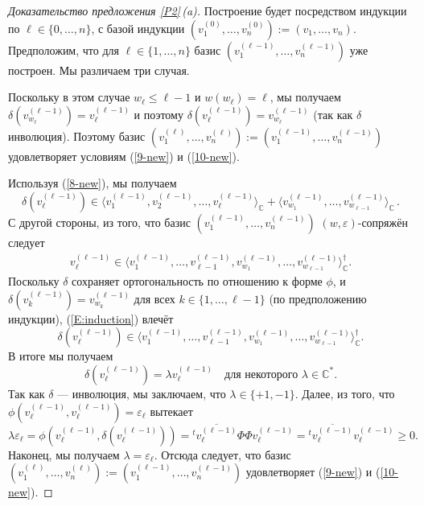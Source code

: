 \documentclass{amsart}
\theoremstyle{definition}
\begin{document}
\begin{proof}[Доказательство предложения \ref{P2}\,{\rm (a)}]
Построение будет посредством индукции по $\ell\in\{0,\ldots,n\}$, с базой индукции
$(v_1^{(0)},\ldots,v_n^{(0)}):=(v_1,\ldots,v_n)$. Предположим, что для
$\ell\in\{1,\ldots,n\}$  базис
$(v_1^{(\ell-1)},\ldots,v_n^{(\ell-1)})$ уже построен. Мы различаем три случая.

\medskip
{}

Поскольку в этом случае $w_\ell\leq\ell-1$ и $w(w_\ell)=\ell$, мы получаем
$\delta(v_{w_\ell}^{(\ell-1)})=v_{\ell}^{(\ell-1)}$ и поэтому
$\delta(v_{\ell}^{(\ell-1)})=v_{w_\ell}^{(\ell-1)}$ (так как
$\delta$ инволюция). Поэтому базис
$(v_1^{(\ell)},\ldots,v_n^{(\ell)}):=(v_1^{(\ell-1)},\ldots,v_n^{(\ell-1)})$
удовлетворяет условиям (\ref{9-new}) и (\ref{10-new}).

\medskip
{}

Используя (\ref{8-new}), мы получаем
\[\delta(v_\ell^{(\ell-1)})\in\langle v_1^{(\ell-1)},v_2^{(\ell-1)},\ldots,v_\ell^{(\ell-1)}\rangle_\mathbb{C}+\langle v_{w_1}^{(\ell-1)},\ldots,v_{w_{\ell-1}}^{(\ell-1)}\rangle_\mathbb{C}\,.\]
С другой стороны, из того, что базис
$(v_1^{(\ell-1)},\ldots,v_n^{(\ell-1)})$
$(w,\varepsilon)$-сопряжён следует
\begin{align}v_\ell^{(\ell-1)}\in\langle v_1^{(\ell-1)},\ldots,v_{\ell-1}^{(\ell-1)},v_{w_1}^{(\ell-1)},\ldots,v_{w_{\ell-1}}^{(\ell-1)}\rangle_\mathbb{C}^\dag.
\label{E:induction}
\end{align}
Поскольку $\delta$ сохраняет ортогональность по отношению к форме
$\phi$, и  $\delta(v_k^{(\ell-1)})=v_{w_k}^{(\ell-1)}$
для всех $k\in\{1,\ldots,\ell-1\}$ (по предположению индукции), (\ref{E:induction}) влечёт
\[\delta(v_\ell^{(\ell-1)})\in\langle v_1^{(\ell-1)},\ldots,v_{\ell-1}^{(\ell-1)},v_{w_1}^{(\ell-1)},\ldots,v_{w_{\ell-1}}^{(\ell-1)}\rangle_\mathbb{C}^\dag.\]
В итоге мы получаем
\[\delta(v_\ell^{(\ell-1)})=\lambda
v_\ell^{(\ell-1)}\quad\mbox{для некоторого $\lambda\in\mathbb{C}^*$.}\]
Так как $\delta$ ---  инволюция, мы заключаем, что $\lambda\in\{+1,-1\}$.
Далее, из того, что
$\phi(v_\ell^{(\ell-1)},v_\ell^{(\ell-1)})=\varepsilon_\ell$ вытекает
\[\lambda\varepsilon_\ell=\phi(v_\ell^{(\ell-1)},\delta(v_\ell^{(\ell-1)}))={}^t\overline{v_\ell^{(\ell-1)}}\Phi\Phi v_\ell^{(\ell-1)}={}^t\overline{v_\ell^{(\ell-1)}}v_\ell^{(\ell-1)}\geq 0.\]
Наконец, мы получаем $\lambda=\varepsilon_\ell$. Отсюда следует, что базис
$(v_1^{(\ell)},\ldots,v_n^{(\ell)}):=(v_1^{(\ell-1)},\ldots,v_n^{(\ell-1)})$
удовлетворяет (\ref{9-new}) и (\ref{10-new}).


\end{proof}
\end{document}
